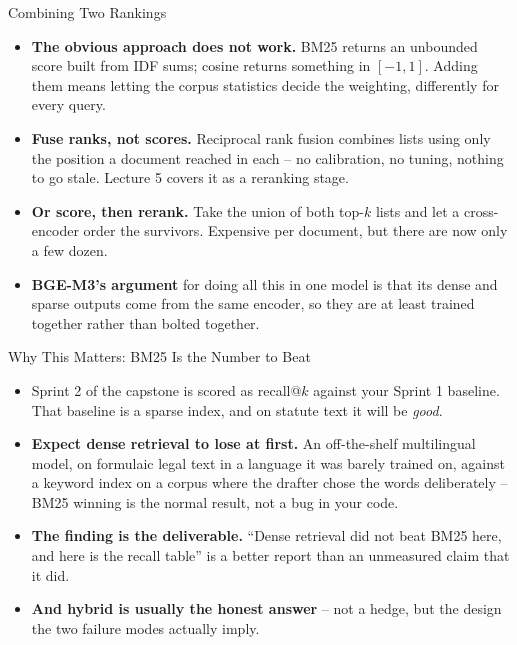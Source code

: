 \begin{frame}{Combining Two Rankings}
\begin{itemize}
  \item \textbf{The obvious approach does not work.} BM25 returns an unbounded score built from IDF sums; cosine returns something in $[-1,1]$. Adding them means letting the corpus statistics decide the weighting, differently for every query.
  \pause
  \item \textbf{Fuse ranks, not scores.} Reciprocal rank fusion combines lists using only the position a document reached in each -- no calibration, no tuning, nothing to go stale. Lecture 5 covers it as a reranking stage.
  \pause
  \item \textbf{Or score, then rerank.} Take the union of both top-$k$ lists and let a cross-encoder order the survivors. Expensive per document, but there are now only a few dozen.
  \pause
  \item \textbf{BGE-M3's argument} for doing all this in one model is that its dense and sparse outputs come from the same encoder, so they are at least trained together rather than bolted together.
\end{itemize}
\end{frame}

\begin{frame}{Why This Matters: BM25 Is the Number to Beat}
\begin{itemize}
  \item Sprint 2 of the capstone is scored as recall@$k$ against your Sprint 1 baseline. That baseline is a sparse index, and on statute text it will be \emph{good}.
  \pause
  \item \textbf{Expect dense retrieval to lose at first.} An off-the-shelf multilingual model, on formulaic legal text in a language it was barely trained on, against a keyword index on a corpus where the drafter chose the words deliberately -- BM25 winning is the normal result, not a bug in your code.
  \pause
  \item \textbf{The finding is the deliverable.} ``Dense retrieval did not beat BM25 here, and here is the recall table'' is a better report than an unmeasured claim that it did.
  \pause
  \item \textbf{And hybrid is usually the honest answer} -- not a hedge, but the design the two failure modes actually imply.
\end{itemize}
\end{frame}

